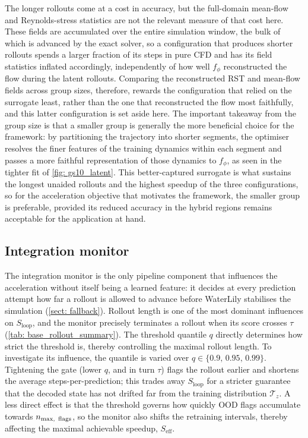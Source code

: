 The longer rollouts come at a cost in accuracy, but the full-domain mean-flow and Reynolds-stress statistics are not the relevant measure of that cost here. These fields are accumulated over the entire simulation window, the bulk of which is advanced by the exact solver, so a configuration that produces shorter rollouts spends a larger fraction of its steps in pure CFD and has its field statistics inflated accordingly, independently of how well $f_\phi$ reconstructed the flow during the latent rollouts. Comparing the reconstructed RST and mean-flow fields across group sizes, therefore, rewards the configuration that relied on the surrogate least, rather than the one that reconstructed the flow most faithfully, and this latter configuration is set aside here. The important takeaway from the group size is that a smaller group is generally the more beneficial choice for the framework: by partitioning the trajectory into shorter segments, the optimiser resolves the finer features of the training dynamics within each segment and passes a more faithful representation of those dynamics to $f_\phi$, as seen in the tighter fit of \autoref{fig: gs10_latent}. This better-captured surrogate is what sustains the longest unaided rollouts and the highest speedup of the three configurations, so for the acceleration objective that motivates the framework, the smaller group is preferable, provided its reduced accuracy in the hybrid regions remains acceptable for the application at hand.


\subsection{Integration monitor}
\label{subsect: 4_integration_monitor}

The integration monitor is the only pipeline component that influences the acceleration without itself being a learned feature: it decides at every prediction attempt how far a rollout is allowed to advance before WaterLily stabilises the simulation (\autoref{sect: fallback}). Rollout length is one of the most dominant influences on $S_\text{loop}$, and the monitor precisely terminates a rollout when its score crosses $\tau$ (\autoref{tab: base_rollout_summary}). The threshold quantile $q$ directly determines how strict the threshold is, thereby controlling the maximal rollout length. To investigate its influence, the quantile is varied over $q \in \{0.9,\,0.95,\,0.99\}$. Tightening the gate (lower $q$, and in turn $\tau$) flags the rollout earlier and shortens the average steps-per-prediction; this trades away $S_\text{loop}$ for a stricter guarantee that the decoded state has not drifted far from the training distribution $\boldsymbol{\mathcal{T}}_z$. A less direct effect is that the threshold governs how quickly OOD flags accumulate towards $n_\text{max,\, flags}$, so the monitor also shifts the retraining intervals, thereby affecting the maximal achievable speedup, $S_\text{eff}$.

